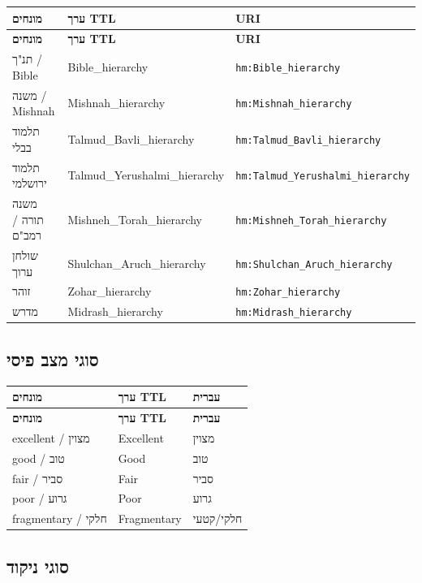 \documentclass[12pt,a4paper]{article}
\newcommand{\ttlprop}[1]{\texttt{#1}}
\begin{document}
\begin{longtable}{|p{4cm}|L{5cm}|L{7cm}|}
\hline
\textbf{מונחים} & \textbf{ערך TTL} & \textbf{URI} \\
\hline
\endfirsthead
\hline
\textbf{מונחים} & \textbf{ערך TTL} & \textbf{URI} \\
\hline
\endhead
\hline
\endfoot
תנ"ך / Bible & Bible\_hierarchy & \ttlprop{hm:Bible\_hierarchy} \\
\hline
משנה / Mishnah & Mishnah\_hierarchy & \ttlprop{hm:Mishnah\_hierarchy} \\
\hline
תלמוד בבלי & Talmud\_Bavli\_hierarchy & \ttlprop{hm:Talmud\_Bavli\_hierarchy} \\
\hline
תלמוד ירושלמי & Talmud\_Yerushalmi\_hierarchy & \ttlprop{hm:Talmud\_Yerushalmi\_hierarchy} \\
\hline
משנה תורה / רמב"ם & Mishneh\_Torah\_hierarchy & \ttlprop{hm:Mishneh\_Torah\_hierarchy} \\
\hline
שולחן ערוך & Shulchan\_Aruch\_hierarchy & \ttlprop{hm:Shulchan\_Aruch\_hierarchy} \\
\hline
זוהר & Zohar\_hierarchy & \ttlprop{hm:Zohar\_hierarchy} \\
\hline
מדרש & Midrash\_hierarchy & \ttlprop{hm:Midrash\_hierarchy} \\
\hline
\end{longtable}

\subsection{סוגי מצב פיסי}

\begin{longtable}{|p{4cm}|L{5cm}|L{7cm}|}
\hline
\textbf{מונחים} & \textbf{ערך TTL} & \textbf{עברית} \\
\hline
\endfirsthead
\hline
\textbf{מונחים} & \textbf{ערך TTL} & \textbf{עברית} \\
\hline
\endhead
\hline
\endfoot
excellent / מצוין & Excellent & מצוין \\
\hline
good / טוב & Good & טוב \\
\hline
fair / סביר & Fair & סביר \\
\hline
poor / גרוע & Poor & גרוע \\
\hline
fragmentary / חלקי & Fragmentary & חלקי/קטעי \\
\hline
\end{longtable}

\subsection{סוגי ניקוד}
\end{document}
